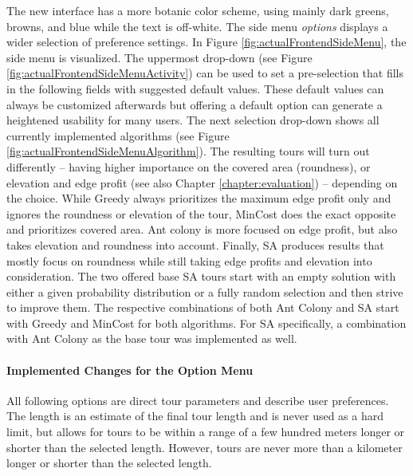The new interface has a more botanic color scheme, using mainly dark greens, browns, and blue while the text is off-white.
The side menu \textit{options} displays a wider selection of preference settings.
In Figure \ref{fig:actualFrontendSideMenu}, the side menu is visualized. 
The uppermost drop-down (see Figure \ref{fig:actualFrontendSideMenuActivity}) can be used to set a pre-selection that fills in the following fields with suggested default values. 
These default values can always be customized afterwards but offering a default option can generate a heightened usability for many users.
The next selection drop-down shows all currently implemented algorithms (see Figure \ref{fig:actualFrontendSideMenuAlgorithm}).
The resulting tours will turn out differently -- having higher importance on the covered area (roundness), or elevation and edge profit (see also Chapter \ref{chapter:evaluation}) -- depending on the choice.
While Greedy always prioritizes the maximum edge profit only and ignores the roundness or elevation of the tour, MinCost does the exact opposite and prioritizes covered area.
Ant colony is more focused on edge profit, but also takes elevation and roundness into account.
Finally, SA produces results that mostly focus on roundness while still taking edge profits and elevation into consideration. 
The two offered base SA tours start with an empty solution with either a given probability distribution or a fully random selection and then strive to improve them. 
The respective combinations of both Ant Colony and SA start with Greedy and MinCost for both algorithms.
For SA specifically, a combination with Ant Colony as the base tour was implemented as well.


\paragraph{Implemented Changes for the Option Menu}

All following options are direct tour parameters and describe user preferences.
The length is an estimate of the final tour length and is never used as a hard limit, but allows for tours to be within a range of a few hundred meters longer or shorter than the selected length.
However, tours are never more than a kilometer longer or shorter than the selected length.


